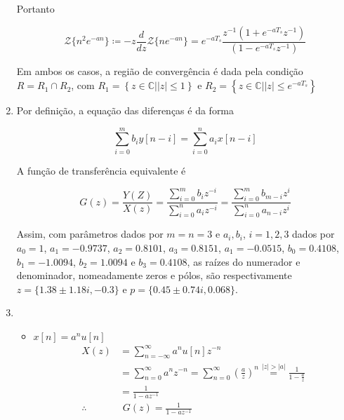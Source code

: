 \begin{enumerate}
        Portanto 
        
            \begin{equation}
                \mathcal{Z}\{n^2 e^{-a n}\} \coloneqq -z \frac{d}{dz} \mathcal{Z}\{n e^{-a n}\} = e^{-a T_s} \frac{z^{-1}(1 + e^{-a T_s} z^{-1})}{(1 - e^{-a T_s} z^{-1})}
            \end{equation}
        
        Em ambos os casos, a região de convergência é dada pela condição $R = R_1 \cap R_2$, com $R_1 = \left\{z \in \mathbb{C} | |z| \leq 1 \right\}$ e $R_2 = \left\{z \in \mathbb{C} | |z| \leq e^{-a T_s} \right\}$
        
        \item %
        
        Por definição, a equação das diferenças é da forma
        
            \begin{equation}
                \sum_{i=0}^{m} b_i y[n-i] = \sum_{i=0}^{n} a_i x[n-i]
            \end{equation}
        
        A função de transferência equivalente é
        
            \begin{equation}
                G(z) = \frac{Y(Z)}{X(z)} = \frac{\sum_{i=0}^{m} b_{i} z^{-i}}{\sum_{i=0}^{n} a_{i} z^{-i}} = \frac{\sum_{i=0}^{m} b_{m-i} z^{i}}{\sum_{i=0}^{n} a_{n-i} z^{i}}
            \end{equation}
        
        Assim, com parâmetros dados por $m = n = 3$ e $a_i, b_i$, $i = 1, 2, 3$ dados por $a_0 = 1$, $a_1 = -0.9737$, $a_2 = 0.8101$, $a_3 = 0.8151$, $a_1 = -0.0515$, $b_0 = 0.4108$, $b_1 = -1.0094$, $b_2 = 1.0094$ e $b_3 = 0.4108$, as raízes do numerador e denominador, nomeadamente zeros e pólos, são respectivamente $z = \{1.38 \pm 1.18 i, -0.3\}$ e $p = \{0.45 \pm 0.74i, 0.068\}$.
        
        \item %
        
            \begin{itemize}
                \item $x[n] = a^n u[n]$
                    \begin{equation}
                        \begin{split}
                            X(z) &= \sum_{n = -\infty}^{\infty} a^n u[n] z^{-n} \\
                            & = \sum_{n 
                            = 0}^{\infty} a^n z^{-n} = \sum_{n = 0}^{\infty} (\frac{a}{z})^n \stackrel{|z| > |a|}{=} \frac{1}{1 - \frac{a}{z}} \\
                            &= \frac{1}{1 - a z^{-1}} \\
                            \therefore & \,\, G(z) = \frac{1}{1 - a z^{-1}}
                        \end{split}
                    \label{eq:anun}
                    \end{equation}
                

\end{itemize}
\end{enumerate}
